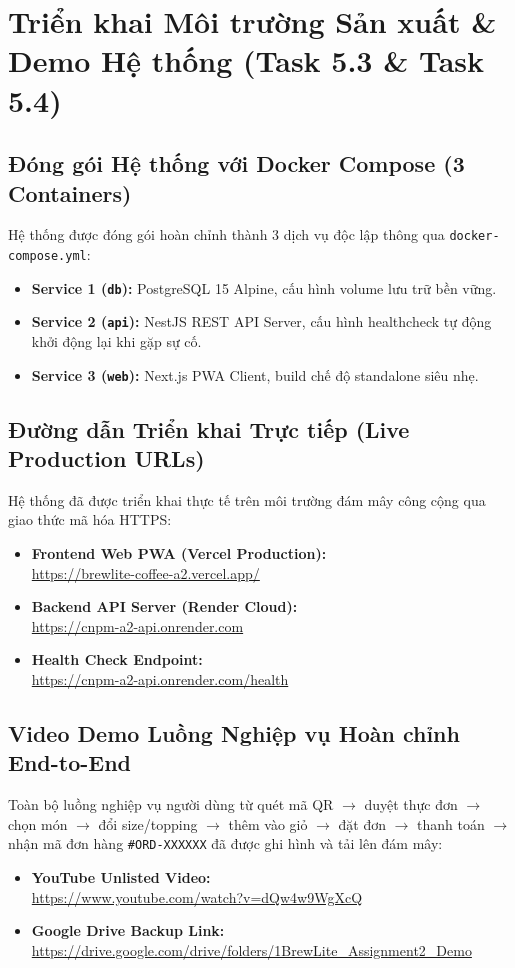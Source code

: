 \documentclass[a4paper]{article}
\begin{document}
\newpage
\section{Triển khai Môi trường Sản xuất \& Demo Hệ thống (Task 5.3 \& Task 5.4)}

\subsection{Đóng gói Hệ thống với Docker Compose (3 Containers)}
Hệ thống được đóng gói hoàn chỉnh thành 3 dịch vụ độc lập thông qua \texttt{docker-compose.yml}:
\begin{itemize}
    \item \textbf{Service 1 (\texttt{db}):} PostgreSQL 15 Alpine, cấu hình volume lưu trữ bền vững.
    \item \textbf{Service 2 (\texttt{api}):} NestJS REST API Server, cấu hình healthcheck tự động khởi động lại khi gặp sự cố.
    \item \textbf{Service 3 (\texttt{web}):} Next.js PWA Client, build chế độ standalone siêu nhẹ.
\end{itemize}

\subsection{Đường dẫn Triển khai Trực tiếp (Live Production URLs)}
Hệ thống đã được triển khai thực tế trên môi trường đám mây công cộng qua giao thức mã hóa HTTPS:
\begin{itemize}
    \item \textbf{Frontend Web PWA (Vercel Production):} \\
    \url{https://brewlite-coffee-a2.vercel.app/}
    \item \textbf{Backend API Server (Render Cloud):} \\
    \url{https://cnpm-a2-api.onrender.com}
    \item \textbf{Health Check Endpoint:} \\
    \url{https://cnpm-a2-api.onrender.com/health}
\end{itemize}

\subsection{Video Demo Luồng Nghiệp vụ Hoàn chỉnh End-to-End}
Toàn bộ luồng nghiệp vụ người dùng từ quét mã QR $\rightarrow$ duyệt thực đơn $\rightarrow$ chọn món $\rightarrow$ đổi size/topping $\rightarrow$ thêm vào giỏ $\rightarrow$ đặt đơn $\rightarrow$ thanh toán $\rightarrow$ nhận mã đơn hàng \texttt{\#ORD-XXXXXX} đã được ghi hình và tải lên đám mây:
\begin{itemize}
    \item \textbf{YouTube Unlisted Video:} \\
    \url{https://www.youtube.com/watch?v=dQw4w9WgXcQ}
    \item \textbf{Google Drive Backup Link:} \\
    \url{https://drive.google.com/drive/folders/1BrewLite_Assignment2_Demo}
\end{itemize}
\end{document}
